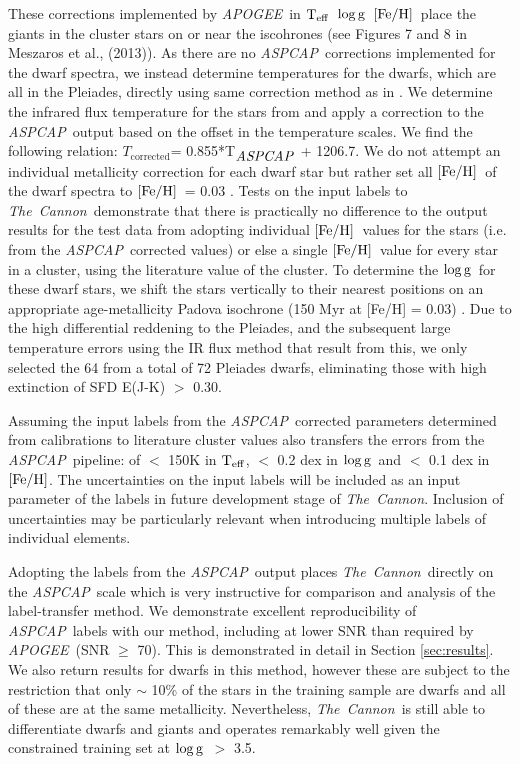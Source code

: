 \documentclass[12pt, preprint]{aastex}
\newcommand{\teff}{\mbox{$\rm T_{eff}$}}
\newcommand{\feh}{\mbox{$\rm [Fe/H]$}}
\newcommand{\logg}{\mbox{$\rm \log g$}}
\newcommand{\tc}{\textsl{The~Cannon}}
\newcommand{\apogee}{\textsl{APOGEE}}
\newcommand{\aspcap}{\textsl{ASPCAP}}
\begin{document}
These corrections implemented by \apogee\ in \teff\, \logg\, \feh\ place the giants in the cluster stars on or near the iscohrones (see Figures 7 and 8 in Meszaros et al., (2013)).  As there are no \aspcap\ corrections implemented for the dwarf spectra, we instead determine temperatures for the dwarfs, which are all in the Pleiades, directly using same correction method as in \citet{Meszaros2013}. We determine the infrared flux temperature for the stars from \citep{Gonzalez2009} and apply a correction to the \aspcap\ output based on the offset in the temperature scales. We find the following relation: $T_{\mbox{corrected}}$= 0.855*T$_{\mbox{\textit{ASPCAP}}}$ + 1206.7. We do not attempt an individual metallicity correction for each dwarf star but rather set all \feh\ of the dwarf spectra to \feh\ = 0.03 \citep{Barrado2001}. Tests on the input labels to \tc\ demonstrate that there is practically no difference to the output results for the test data from adopting individual \feh\ values for the stars (i.e. from the \aspcap\ corrected values) or else a single \feh\ value for every star in a cluster, using the literature value of the cluster. To determine the \logg\ for these dwarf stars, we shift the stars vertically to their nearest positions on an appropriate age-metallicity Padova isochrone (150 Myr at [Fe/H] = 0.03) \citep{Girardi2010}. Due to the high differential reddening to the Pleiades, and the subsequent large temperature errors using the IR flux method that result from this, we only selected the 64 from a total of 72 Pleiades dwarfs, eliminating those with high extinction of SFD E(J-K) $>$ 0.30.

Assuming the input labels from the \aspcap\ corrected parameters determined from calibrations to literature cluster values also transfers the errors from the \aspcap\ pipeline: of $<$ 150K in \teff,  $<$ 0.2 dex in \logg\ and $<$ 0.1 dex in \feh.   The uncertainties on the input labels will be included as an input parameter of the labels in future development stage of \tc. Inclusion of uncertainties may be particularly relevant when introducing multiple labels of individual elements. 

Adopting the labels from the \aspcap\ output places \tc\ directly on the \aspcap\ scale which is very instructive for comparison and analysis of the label-transfer method. We demonstrate excellent reproducibility of \aspcap\ labels with our method, including at lower SNR than required by \apogee\ (SNR $\ge$ 70). This is demonstrated in detail in Section \ref{sec:results}. We also return results for dwarfs in this method, however these are subject to the restriction that only $\sim$ 10\% of the stars in the training sample are dwarfs and all of these are at the same metallicity. Nevertheless, \tc\ is still able to differentiate dwarfs and giants and operates remarkably well given the constrained training set at \logg\ $>$ 3.5. 
\end{document}
